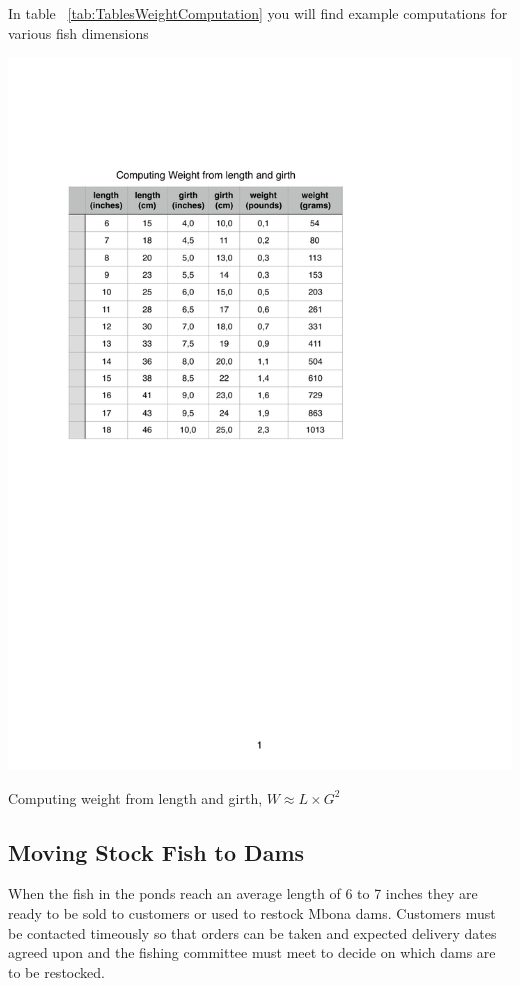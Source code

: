 In table ~\ref{tab:TablesWeightComputation} you will find example computations for various fish dimensions

\begin{table}[H]
  \centering
   \includegraphics[scale = 0.8]{tables/TablesWeightComputation.pdf}
   \caption{Computing weight from length and girth, $W \approx L \times G^2$}
   \label{tab:TablesWeightComputation}
\end{table}




\subsection{Moving Stock Fish to Dams}
   
    When the fish in the ponds reach an average length of 6 to 7 inches they are ready to
    be sold to customers or used to restock Mbona dams. Customers must be contacted
    timeously so that orders can be taken and expected delivery dates agreed upon and 
    the fishing committee must meet to decide on which dams are to be restocked.
    
